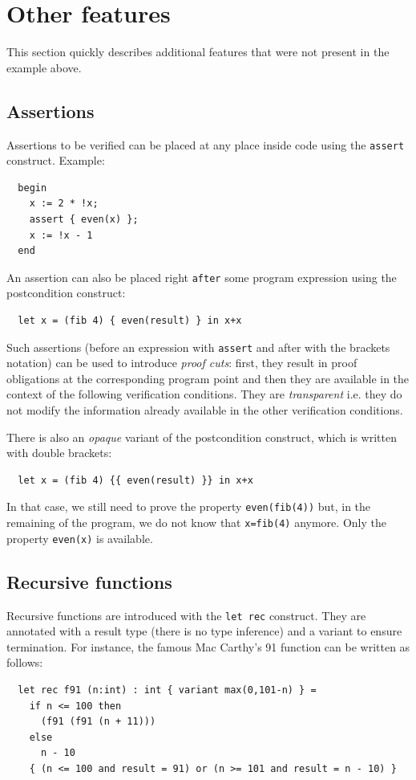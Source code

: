 \documentclass[a4paper,12pt]{report}
\makeatletter
\newcommand{\indextt}[1]{\index{#1@\texttt{#1}}}
\makeatother
\begin{document}
\section{Other features}

This section quickly describes additional features that were not
present in the example above.

\subsection{Assertions}\indextt{assert}
Assertions to be verified can be placed at any place inside code using the
\texttt{assert} construct. Example:
\begin{verbatim}
  begin 
    x := 2 * !x;
    assert { even(x) };
    x := !x - 1
  end
\end{verbatim}
An assertion can also be placed right \texttt{after} some program
expression using the postcondition construct:
\begin{verbatim}
  let x = (fib 4) { even(result) } in x+x
\end{verbatim}

Such assertions (before an expression with \texttt{assert} and after
with the brackets notation) can be used to introduce \emph{proof
  cuts}: first, they result in proof obligations at the corresponding
program point and then they are available in the context of the
following verification conditions. They are \emph{transparent}
i.e. they do not modify the information already available in the other
verification conditions.

There is also an \emph{opaque} variant of the postcondition construct,
which is written with double brackets:
\begin{verbatim}
  let x = (fib 4) {{ even(result) }} in x+x
\end{verbatim}
In that case, we still need to prove the property
\texttt{even(fib(4))} but, in the remaining of the program, we do not
know that \texttt{x=fib(4)} anymore. Only the property
\texttt{even(x)} is available.

\subsection{Recursive functions}
Recursive functions are introduced with the \texttt{let rec}
construct. They are annotated with a result type (there is no type
inference) and a variant to ensure termination.
For instance, the famous Mac Carthy's 91 function can be written as follows:
\begin{verbatim}
  let rec f91 (n:int) : int { variant max(0,101-n) } =
    if n <= 100 then
      (f91 (f91 (n + 11)))
    else
      n - 10
    { (n <= 100 and result = 91) or (n >= 101 and result = n - 10) }
\end{verbatim}
\end{document}
